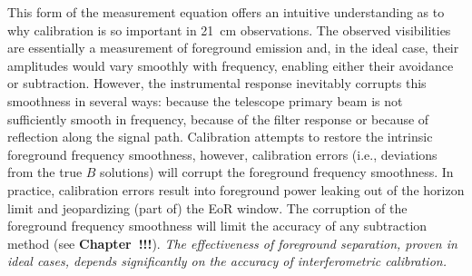 This form of the measurement equation offers an intuitive understanding as to why calibration is so important in 21~cm observations. The observed visibilities are essentially a measurement of foreground emission and, in the ideal case, their amplitudes would vary smoothly with frequency, enabling  either their avoidance or subtraction. However, the instrumental response inevitably corrupts this smoothness in several ways: because the telescope primary beam is not sufficiently smooth in frequency, because of the filter response or because of reflection along the signal path. Calibration attempts to restore the intrinsic foreground frequency smoothness, however, calibration errors (i.e., deviations from the true $B$ solutions) will corrupt the foreground frequency smoothness. In practice, calibration errors result into foreground power leaking out of the horizon limit and jeopardizing (part of) the EoR window. The corruption of the foreground frequency smoothness will limit the accuracy of any subtraction method (see {\bf Chapter~!!!}). {\it The effectiveness of foreground separation, proven in ideal cases, depends significantly on the accuracy of interferometric calibration.}

